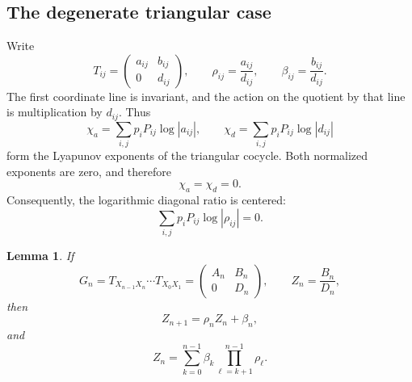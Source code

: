 \documentclass[11pt,a4paper]{amsart}
\newtheorem{lemma}[theorem]{Lemma}
\theoremstyle{definition}
\theoremstyle{remark}
\numberwithin{equation}{section}
\newcommand{\1}{\boldsymbol 1}
\begin{document}
\subsection{The degenerate triangular case}
Write
\begin{equation}\label{eq:triangular-edge}
 T_{ij}=\begin{pmatrix}a_{ij}&b_{ij}\\0&d_{ij}\end{pmatrix},
 \qquad
 \rho_{ij}=\frac{a_{ij}}{d_{ij}},
 \qquad
 \beta_{ij}=\frac{b_{ij}}{d_{ij}}.
\end{equation}
The first coordinate line is invariant, and the action on the quotient
by that line is multiplication by $d_{ij}$.  Thus 
\begin{equation}\label{eq:triangular-line-exponents-detailed}
 \chi_a=\sum_{i,j}p_iP_{ij}\log|a_{ij}|,
 \qquad
 \chi_d=\sum_{i,j}p_iP_{ij}\log|d_{ij}|
\end{equation}
form the Lyapunov exponents of the triangular cocycle.  Both normalized exponents are zero, and therefore
$$
 \chi_a=\chi_d=0.
$$
Consequently, the logarithmic diagonal ratio is centered:
\begin{equation}\label{eq:critical-drift-article}
 \sum_{i,j}p_iP_{ij}\log|\rho_{ij}|=0.
\end{equation}

\begin{lemma}
\label{lem:affine-coordinate}
If
$$
 G_n=T_{X_{n-1}X_n}\cdots T_{X_0X_1}
 =\begin{pmatrix}A_n&B_n\\0&D_n\end{pmatrix},
 \qquad Z_n=\frac{B_n}{D_n},
$$
then
\begin{equation}\label{eq:affine-recursion}
 Z_{n+1}=\rho_nZ_n+\beta_n,
\end{equation}
and
\begin{equation}\label{eq:finite-perpetuity}
 Z_n=\sum_{k=0}^{n-1}\beta_k
       \prod_{\ell=k+1}^{n-1}\rho_\ell.
\end{equation}
\end{lemma}
\end{document}
